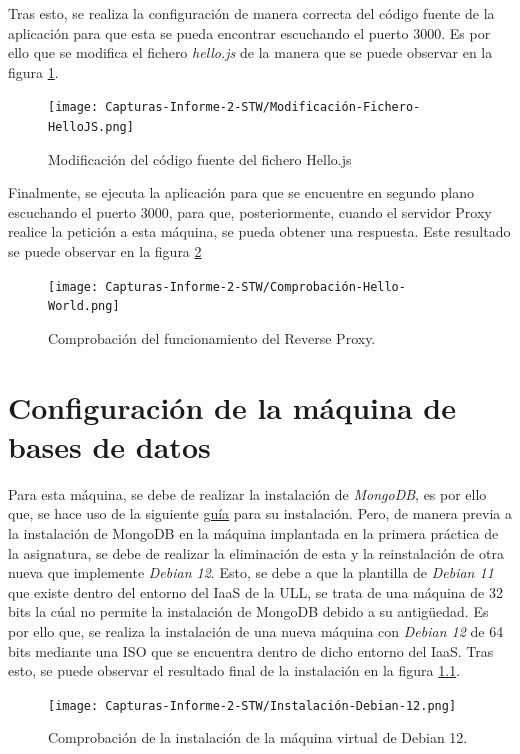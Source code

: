 \documentclass{report}
\begin{document}
  Tras esto, se realiza la configuración de manera correcta del código fuente de la aplicación para que esta se pueda encontrar escuchando el puerto 3000. Es por ello que se modifica el fichero \emph{hello.js} de la manera que se puede observar en la figura \ref{fig:Configuración-puerto-3000}.

  \begin{figure}[H]
    \centering
    \texttt{[image: Capturas-Informe-2-STW/Modificación-Fichero-HelloJS.png]}
    \caption{Modificación del código fuente del fichero Hello.js}
    \label{fig:Configuración-puerto-3000}
  \end{figure}

  Finalmente, se ejecuta la aplicación para que se encuentre en segundo plano escuchando el puerto 3000, para que, posteriormente, cuando el servidor Proxy realice la petición a esta máquina, se pueda obtener una respuesta. Este resultado se puede observar en la figura \ref{fig:Comprobación-Backend}

  \begin{figure}[H]
    \centering
    \texttt{[image: Capturas-Informe-2-STW/Comprobación-Hello-World.png]}
    \caption{Comprobación del funcionamiento del Reverse Proxy.}
    \label{fig:Comprobación-Backend}
  \end{figure}

  \chapter{Configuración de la máquina de bases de datos}
  Para esta máquina, se debe de realizar la instalación de \emph{MongoDB}, es por ello que, se hace uso de la siguiente \href{https://www.mongodb.com/docs/manual/tutorial/install-mongodb-on-debian/}{guía} para su instalación. Pero, de manera previa a la instalación de MongoDB en la máquina implantada en la primera práctica de la asignatura, se debe de realizar la eliminación de esta y la reinstalación de otra nueva que implemente \emph{Debian 12}. Esto, se debe a que la plantilla de \emph{Debian 11} que existe dentro del entorno del IaaS de la ULL, se trata de una máquina de 32 bits la cúal no permite la instalación de MongoDB debido a su antigüedad. Es por ello que, se realiza la instalación de una nueva máquina con \emph{Debian 12} de 64 bits mediante una ISO que se encuentra dentro de dicho entorno del IaaS. Tras esto, se puede observar el resultado final de la instalación en la figura \ref{fig:Comprobación-Debian12}.

  \begin{figure}[H]
    \centering
    \texttt{[image: Capturas-Informe-2-STW/Instalación-Debian-12.png]}
    \caption{Comprobación de la instalación de la máquina virtual de Debian 12.}
    \label{fig:Comprobación-Debian12}
  \end{figure}
\end{document}
